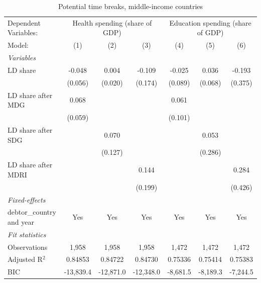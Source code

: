 
\begin{table}[htbp]
   \caption{\label{tab:results_iv_time_breaks_other} Potential time breaks, middle-income countries}
   \centering
   \begin{tabular}{lcccccc}
      \tabularnewline \midrule \midrule
      Dependent Variables: & \multicolumn{3}{c}{Health spending (share of GDP)} & \multicolumn{3}{c}{Education spending (share of GDP)}\\
      Model:                                & (1)       & (2)       & (3)       & (4)      & (5)      & (6)\\  
      \midrule
      \emph{Variables}\\
      LD share                              & -0.048    & 0.004     & -0.109    & -0.025   & 0.036    & -0.193\\   
                                            & (0.056)   & (0.020)   & (0.174)   & (0.089)  & (0.068)  & (0.375)\\   
      LD share after MDG                    & 0.068     &           &           & 0.061    &          &   \\   
                                            & (0.059)   &           &           & (0.101)  &          &   \\   
      LD share after SDG                    &           & 0.070     &           &          & 0.053    &   \\   
                                            &           & (0.127)   &           &          & (0.286)  &   \\   
      LD share after MDRI                   &           &           & 0.144     &          &          & 0.284\\   
                                            &           &           & (0.199)   &          &          & (0.426)\\   
      \midrule
      \emph{Fixed-effects}\\
      debtor\_country and year              & Yes       & Yes       & Yes       & Yes      & Yes      & Yes\\  
      \midrule
      \emph{Fit statistics}\\
      Observations                          & 1,958     & 1,958     & 1,958     & 1,472    & 1,472    & 1,472\\  
      Adjusted R$^2$                        & 0.84853   & 0.84722   & 0.84730   & 0.75336  & 0.75414  & 0.75383\\  
      BIC                                   & -13,839.4 & -12,871.0 & -12,348.0 & -8,681.5 & -8,189.3 & -7,244.5\\  

\end{tabular}
\end{table}
